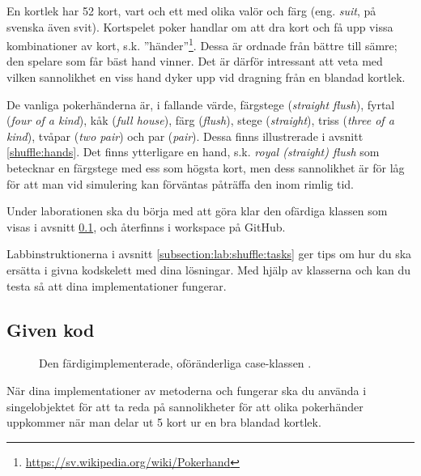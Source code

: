 En kortlek  har 52 kort, vart och ett med olika valör  och färg (eng. \emph{suit}, på svenska även svit). Kortspelet poker handlar om att dra kort och få upp vissa kombinationer av kort, s.k. ''händer''\footnote{\href{https://sv.wikipedia.org/wiki/Pokerhand}{https://sv.wikipedia.org/wiki/Pokerhand}}. Dessa är ordnade från bättre till sämre; den spelare som får bäst hand vinner.
Det är därför intressant att veta med vilken sannolikhet en viss hand dyker upp vid dragning från en blandad kortlek.

De vanliga pokerhänderna är, i fallande värde, färgstege (\emph{straight flush}), fyrtal (\emph{four of a kind}), kåk (\emph{full house}), färg (\emph{flush}), stege (\emph{straight}), triss (\emph{three of a kind}), tvåpar (\emph{two pair}) och par (\emph{pair}). Dessa finns illustrerade i avsnitt \ref{shuffle:hands}.
Det finns ytterligare en hand, s.k. \emph{royal (straight) flush} som betecknar en färgstege med ess som högsta kort, men dess sannolikhet är för låg för att man vid simulering kan förväntas påträffa den inom rimlig tid.

Under laborationen ska du börja med att göra klar den ofärdiga klassen  som visas i avsnitt \ref{shuffle:given}, och återfinns i workspace på GitHub.

Labbinstruktionerna i avsnitt \ref{subsection:lab:shuffle:tasks} ger tips om hur du ska ersätta  i givna kodskelett med dina lösningar.
Med hjälp av klasserna  och  kan du testa så att dina implementationer fungerar.



\subsection{Given kod}\label{shuffle:given}

\begin{figure}
\caption{Den färdigimplementerade, oföränderliga case-klassen .}
\label{shuffle:fig-card}
\end{figure}


När dina implementationer av metoderna  och  fungerar ska du använda  i singelobjektet  för att ta reda på sannolikheter för att olika pokerhänder uppkommer när man delar ut 5 kort ur en bra blandad kortlek.

